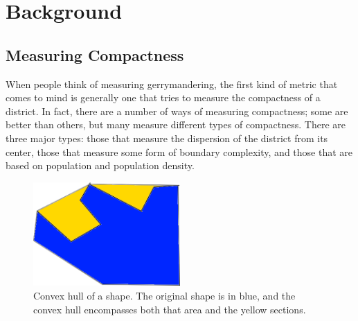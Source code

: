 \documentclass[12pt]{article}
\begin{document}
  \section{Background}\label{s:background}

  \subsection{Measuring Compactness}

  When people think of measuring gerrymandering, the first kind of metric that comes to mind is generally one that tries to measure the compactness of a district.  In fact, there are a number of ways of measuring compactness; some are better than others, but many measure different types of compactness.  There are three major types: those that measure the dispersion of the district from its center, those that measure some form of boundary complexity, and those that are based on population and population density.

  \begin{figure}
    \begin{center}
      \parbox{\textwidth}{\centering \includegraphics[width=0.5\textwidth]{convexhull.png}}
      \parbox{\textwidth}{\centering \parbox{0.9\textwidth}{\caption{Convex hull of a shape. The original shape is in blue, and the convex hull encompasses both that area and the yellow sections.\label{f:convexhull}}}}
    \end{center}
  \end{figure}
\end{document}
